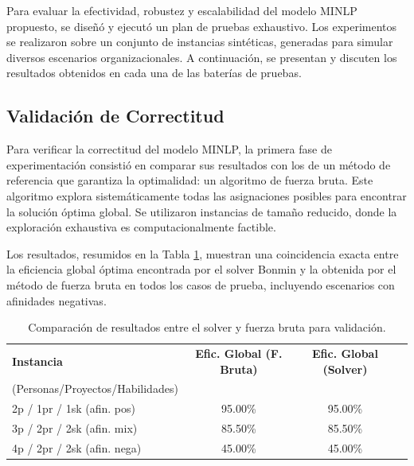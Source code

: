 \documentclass[conference]{IEEEtran}
\begin{document}
\par Para evaluar la efectividad, robustez y escalabilidad del modelo MINLP propuesto, se diseñó y ejecutó un plan de pruebas exhaustivo. Los experimentos se realizaron sobre un conjunto de instancias sintéticas, generadas para simular diversos escenarios organizacionales. A continuación, se presentan y discuten los resultados obtenidos en cada una de las baterías de pruebas.

\subsection{Validación de Correctitud}
Para verificar la correctitud del modelo MINLP, la primera fase de experimentación consistió en comparar sus resultados con los de un método de referencia que garantiza la optimalidad: un algoritmo de fuerza bruta. Este algoritmo explora sistemáticamente todas las asignaciones posibles para encontrar la solución óptima global. Se utilizaron instancias de tamaño reducido, donde la exploración exhaustiva es computacionalmente factible.

Los resultados, resumidos en la Tabla \ref{tab:correctitud}, muestran una coincidencia exacta entre la eficiencia global óptima encontrada por el solver Bonmin y la obtenida por el método de fuerza bruta en todos los casos de prueba, incluyendo escenarios con afinidades negativas.

\begin{table}[htbp]
    \centering
    \caption{Comparación de resultados entre el solver y fuerza bruta para validación.}
    \label{tab:correctitud}
    \begin{tabularx}{\linewidth}{@{}lccc@{}}
        \toprule
        \textbf{Instancia}               & \textbf{Efic. Global (F. Bruta)} & \textbf{Efic. Global (Solver)}   \\
        (Personas/Proyectos/Habilidades) &                                  &                                & \\
        \midrule
        2p / 1pr / 1sk (afin. pos)       & 95.00\%                          & 95.00\%                          \\
        3p / 2pr / 2sk (afin. mix)       & 85.50\%                          & 85.50\%                          \\
        4p / 2pr / 2sk (afin. nega)      & 45.00\%                          & 45.00\%                          \\
        \bottomrule
    \end{tabularx}
\end{table}
\end{document}

